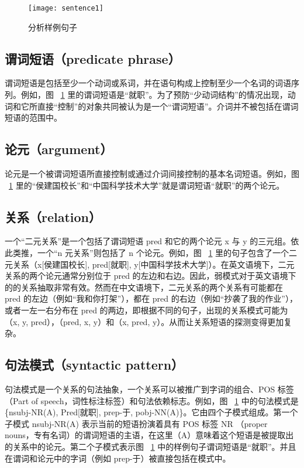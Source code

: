 \begin{figure}[ht]
\centering
\texttt{[image: sentence1]}
\caption{分析样例句子}\label{fig:sentence1}
\end{figure}

\subsection{谓词短语（predicate phrase）}
谓词短语是包括至少一个动词或系词，并在语句构成上控制至少一个名词的词语序列。例如，图 ~\ref{fig:sentence1} 里的谓词短语是“就职”。为了预防“少动词结构”的情况出现，动词和它所直接“控制”的对象共同被认为是一个“谓词短语”。介词并不被包括在谓词短语的范围中。

\subsection{论元（argument）}
论元是一个被谓词短语所直接控制或通过介词间接控制的基本名词短语。例如，图 ~\ref{fig:sentence1} 里的“侯建国校长”和“中国科学技术大学”就是谓词短语“就职”的两个论元。

\subsection{关系（relation）}
一个“二元关系”是一个包括了谓词短语 pred 和它的两个论元 x 与 y 的三元组。依此类推，一个“n 元关系”则包括了 n 个论元。例如，图 ~\ref{fig:sentence1} 里的句子包含了一个二元关系（x[侯建国校长], pred[就职], y[中国科学技术大学]）。在英文语境下，二元关系的两个论元通常分别位于 pred 的左边和右边。因此，弱模式对于英文语境下的的关系抽取非常有效。然而在中文语境下，二元关系的两个关系有可能都在 pred 的左边（例如“我和你打架”），都在 pred 的右边（例如“抄袭了我的作业”），或者一左一右分布在 pred 的两边，即根据不同的句子，出现的关系模式可能为（x, y, pred），（pred, x, y）和（x, pred, y）。从而让关系短语的探测变得更加复杂。

\subsection{句法模式（syntactic pattern）}
句法模式是一个关系的句法抽象，一个关系可以被推广到字词的组合、POS 标签（Part of speech，词性标注标签）和句法依赖标志。例如，图 ~\ref{fig:sentence1} 中的句法模式是\{nsubj-NR(A), Pred[就职], prep-于, pobj-NN(A)\}。它由四个子模式组成。第一个子模式 nsubj-NR(A) 表示当前的短语扮演着具有 POS 标签 NR （proper nouns，专有名词）的谓词短语的主语，在这里（A）意味着这个短语是被提取出的关系中的论元。第二个子模式表示图 ~\ref{fig:sentence1} 中的样例句子谓词短语是“就职”。并且在谓词和论元中的字词（例如 prep-于）被直接包括在模式中。

